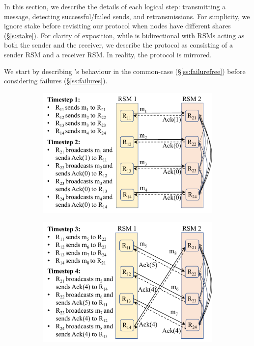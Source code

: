 In this section, we describe the details of each logical step: transmitting a message, detecting successful/failed sends, and retransmissions. For simplicity, we ignore stake before revisiting our protocol when nodes have different shares (\S\ref{s:stake}). 
For clarity of exposition, while \Scrooge{} is bidirectional with RSMs acting as both the sender and the receiver, we describe the protocol as consisting of a sender RSM and a receiver RSM. In reality, the protocol is mirrored.

We start by describing \Scrooge{}'s behaviour in the common-case (\S\ref{ss:failurefree}) before considering failures (\S\ref{ss:failures}). 



\begin{figure}[t]
    \centering
    \begin{subfigure}[t]{0.494\columnwidth}
         \centering
         \includegraphics[width=\columnwidth]{acking-p1.pdf}
         \label{sfig:first}
     \end{subfigure}
     \begin{subfigure}[t]{0.494\columnwidth}
         \centering
         \includegraphics[width=\columnwidth]{acking-p2.pdf}

\end{subfigure}
\end{figure}
